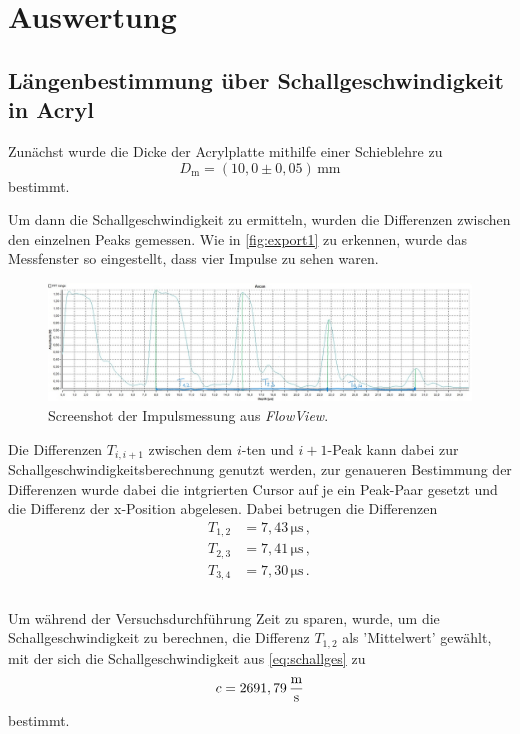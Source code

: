 \section{Auswertung}
\label{sec:auswertung}

\subsection{Längenbestimmung über Schallgeschwindigkeit in Acryl}
\label{subsec:längenbest}

Zunächst wurde die Dicke der Acrylplatte mithilfe einer Schieblehre zu
\begin{equation*}
    D_\text{m} = (10,0 \pm 0,05) \,\unit{\milli\meter}
\end{equation*}
bestimmt.

Um dann die Schallgeschwindigkeit zu ermitteln, wurden die Differenzen zwischen den einzelnen Peaks gemessen.
Wie in \autoref{fig:export1} zu erkennen, wurde das Messfenster so eingestellt, dass vier Impulse zu sehen waren.

\begin{figure}
    \centering
    \includegraphics[width=\textwidth]{figures/MessungAcrylplatte(1).jpg}
    \caption{Screenshot der Impulsmessung aus \textit{FlowView}.}
    \label{fig:export1}
\end{figure}

Die Differenzen $T_{i,i+1}$ zwischen dem $i$-ten und $i + 1$-Peak kann dabei zur Schallgeschwindigkeitsberechnung genutzt werden, zur genaueren Bestimmung
der Differenzen wurde dabei die intgrierten Cursor auf je ein Peak-Paar gesetzt und die Differenz der x-Position abgelesen.
Dabei betrugen die Differenzen
\begin{align*}
    T_{1,2} &= 7,43 \,\unit{\micro\second} \,,\\
    T_{2,3} &= 7,41 \,\unit{\micro\second} \,,\\
    T_{3,4} &= 7,30 \,\unit{\micro\second} \,.\\
\end{align*} \\

Um während der Versuchsdurchführung Zeit zu sparen, wurde, um die Schallgeschwindigkeit zu berechnen, die Differenz $T_{1,2}$ als 'Mittelwert' gewählt,
mit der sich die Schallgeschwindigkeit aus \eqref{eq:schallges} zu
\begin{equation*}
    c = 2691,79 \,\unit{\frac{\meter}{\second}}
\end{equation*}
bestimmt. \\

